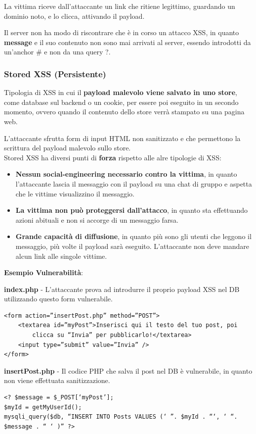 \documentclass{article}
\begin{document}
La vittima riceve dall'attaccante un link che ritiene legittimo, guardando un dominio noto, e lo clicca, attivando il payload. 

Il server non ha modo di riscontrare che è in corso un attacco XSS, in quanto \textbf{message} e il suo contenuto non sono mai arrivati al server, essendo introdotti da un’anchor \# e non da una query ?. 

\subsubsection{Stored XSS (Persistente)}
Tipologia di XSS in cui il \textbf{payload malevolo viene salvato in uno store}, come database sul backend o un cookie, per essere poi eseguito in un secondo momento, ovvero quando il contenuto dello store verrà stampato su una pagina web.

L'attaccante sfrutta form di input HTML non sanitizzato e che permettono la scrittura del payload malevolo sullo store.\\
Stored XSS ha diversi punti di \textbf{forza} rispetto alle alre tipologie di XSS:
\begin{itemize}
	\item \textbf{Nessun social-engineering necessario contro la vittima}, in quanto l'attaccante lascia il messaggio con il payload su una chat di gruppo e aspetta che le vittime visualizzino il messaggio.
	
	\item \textbf{La vittima non può proteggersi dall'attacco}, in quanto sta effettuando azioni abituali e non si accorge di un messaggio farsa.
	
	\item \textbf{Grande capacità di diffusione}, in quanto più sono gli utenti che leggono il messaggio, più volte il payload sarà eseguito. L'attaccante non deve mandare alcun link alle singole vittime. 
\end{itemize}

\textbf{Esempio Vulnerabilità}:

\textbf{index.php} - L'attaccante prova ad introdurre il proprio payload XSS nel DB utilizzando questo form vulnerabile.
\begin{verbatim}
<form action=”insertPost.php” method=”POST”>
	<textarea id=”myPost”>Inserisci qui il testo del tuo post, poi 
		clicca su “Invia” per pubblicarlo!</textarea>
	<input type=”submit” value=”Invia” />
</form>
\end{verbatim}

\textbf{insertPost.php} - Il codice PHP che salva il post nel DB è vulnerabile, in quanto non viene effettuata sanitizzazione.
\begin{verbatim}
<? $message = $_POST[‘myPost’];
$myId = getMyUserId();
mysqli_query($db, “INSERT INTO Posts VALUES (‘ ”. $myId . “‘, ‘ “. $message . “ ‘ )” ?>
\end{verbatim}
\end{document}
